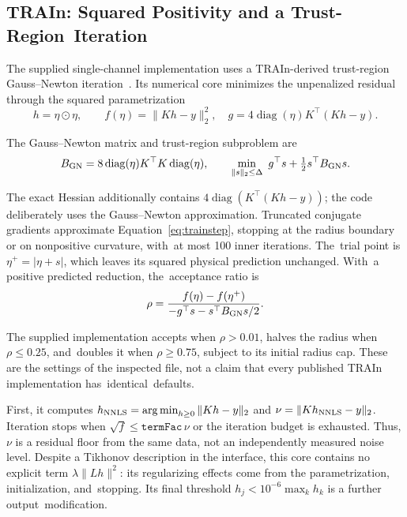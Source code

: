 \documentclass[mathematics,article,accept,moreauthors]{Definitions/mdpi}
\newcommand{\argmin}{\operatorname*{arg\,min}}
\newcommand{\diag}{\operatorname{diag}}
\begin{document}
\subsection{TRAIn: Squared Positivity and a Trust-Region~Iteration}\label{sec:trainmath}
The supplied single-channel implementation uses a TRAIn-derived trust-region Gauss--Newton iteration~\cite{train}. Its numerical core minimizes the unpenalized residual through the squared parametrization
\begin{equation}\label{eq:trainobjective}
 h=\eta\odot\eta,\qquad f(\eta)=\|Kh-y\|_2^2,
 \quad g=4\diag(\eta)K^\top(Kh-y).
\end{equation}

The Gauss--Newton matrix and trust-region subproblem are
\begin{equation}\label{eq:trainstep}
 B_{\rm GN}=8\diag(\eta)K^\top K\diag(\eta),\qquad
 \min_{\|s\|_2\leq\Delta}\ g^\top s+\tfrac12s^\top B_{\rm GN}s.
\end{equation}

The exact Hessian additionally contains $4\diag(K^\top(Kh-y))$; the code deliberately uses the Gauss--Newton approximation. Truncated conjugate gradients approximate \mbox{Equation~\eqref{eq:trainstep},} stopping at the radius boundary or on nonpositive curvature, with~at most 100 inner iterations. The~trial point is $\eta^+=|\eta+s|$, which leaves its squared physical prediction unchanged. With~a positive predicted reduction, the~acceptance ratio is
\begin{equation}\label{eq:trainratio}
 \rho=\frac{f(\eta)-f(\eta^+)}{-g^\top s-s^\top B_{\rm GN}s/2}.
\end{equation}

The supplied implementation accepts when $\rho>0.01$, halves the radius when $\rho\leq0.25$, and~doubles it when $\rho\geq0.75$, subject to its initial radius cap. These are the settings of the inspected file, not a claim that every published TRAIn implementation has\mbox{ identical~defaults.}

First, it computes $h_{\rm NNLS}=\argmin_{h\geq0}\|Kh-y\|_2$ and $\nu=\|Kh_{\rm NNLS}-y\|_2$. Iteration stops when $\sqrt{f}\leq\mathtt{termFac}\,\nu$ or the iteration budget is exhausted. Thus, $\nu$ is a residual floor from the same data, not an independently measured noise level. Despite a Tikhonov description in the interface, this core contains no explicit term $\lambda\|Lh\|^2$: its regularizing effects come from the parametrization, initialization, and~stopping. Its final threshold $h_j<10^{-6}\max_kh_k$ is a further output~modification.
\end{document}
